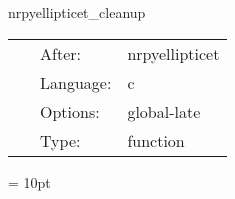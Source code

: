 \hspace{5mm} nrpyellipticet\_cleanup 

\hspace{5mm}{\it deallocate memory for arrays used when computing initial data } 


\hspace{5mm}

 \begin{tabular*}{160mm}{cll} 
~ & After:  & nrpyellipticet \\ 
~ & Language:  & c \\ 
~ & Options:  & global-late \\ 
~ & Type:  & function \\ 
\end{tabular*} 



\vspace{5mm}\parskip = 10pt 

